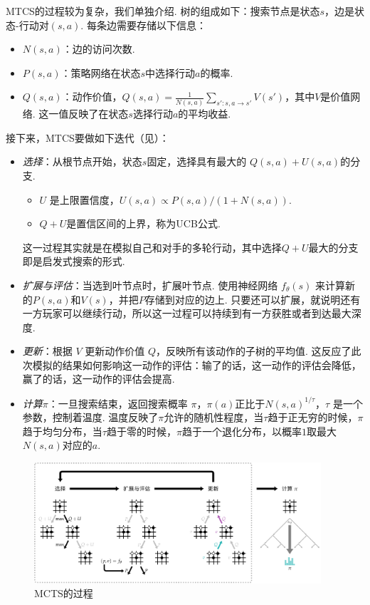 MTCS的过程较为复杂，我们单独介绍. 树的组成如下：搜索节点是状态$s$，边是状态-行动对$(s,a)$. 每条边需要存储以下信息：
\begin{itemize}
    \item $N(s,a)$：边的访问次数.
    \item $P(s,a)$：策略网络在状态$s$中选择行动$a$的概率.
    \item $Q(s,a)$：动作价值，$Q(s,a)=\frac{1}{N(s,a)}\sum_{s':s,a\to s'} V(s')$，其中$V$是价值网络. 这一值反映了在状态$s$选择行动$a$的平均收益.
\end{itemize}

接下来，MTCS要做如下迭代（见）：
\begin{itemize}
  \item \textit{选择}：从根节点开始，状态$s$固定，选择具有最大的 $Q(s,a) + U(s,a)$的分支. 
  \begin{itemize}
    \item $U$ 是上限置信度，$U(s,a)\propto{P(s,a)}/(1+N(s,a))$.
    \item $Q+U$是置信区间的上界，称为UCB公式. 
  \end{itemize}
  这一过程其实就是在模拟自己和对手的多轮行动，其中选择$Q+U$最大的分支即是启发式搜索的形式. 

  \item \textit{扩展与评估}：当选到叶节点时，扩展叶节点. 使用神经网络 $f_\theta(s)$ 来计算新的$P(s,a)$和$V(s)$，并把$P$存储到对应的边上. 只要还可以扩展，就说明还有一方玩家可以继续行动，所以这一过程可以持续到有一方获胜或者到达最大深度.

  \item \textit{更新}：根据 $V$ 更新动作价值 $Q$，反映所有该动作的子树的平均值. 这反应了此次模拟的结果如何影响这一动作的评估：输了的话，这一动作的评估会降低，赢了的话，这一动作的评估会提高.

  \item \textit{计算$\pi$}：一旦搜索结束，返回搜索概率 $\pi$，$\pi(a)$正比于$N(s,a)^{1/\tau}$，$\tau$ 是一个参数，控制着温度. 温度反映了$\pi$允许的随机性程度，当$\tau$趋于正无穷的时候，$\pi$趋于均匀分布，当$\tau$趋于零的时候，$\pi$趋于一个退化分布，以概率$1$取最大$N(s,a)$对应的$a$.
\end{itemize}

\begin{figure}[ht]
\centering
\includegraphics[width=0.95\textwidth]{figures/game/mcts.pdf}
    \caption{MCTS的过程}
    \label{fig:mcts}
\end{figure}

